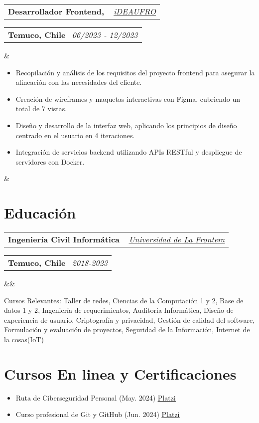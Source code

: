 \documentclass[11pt,a4paper,sans]{moderncv}
\makeatletter
\newcommand{\sectionMargin}{-3mm}
\newcommand*{\customcventry}[7][.13em]{
    \begin{tabular}{@{}l}
    {\bfseries #4} \
    {\itshape #3}
    \end{tabular}
    \hfill
    \begin{tabular}{l@{}}
    {\bfseries #5} \
    {\itshape #2}
    \end{tabular}
    \ifx&#7&%
    \else{\
    \begin{minipage}{\maincolumnwidth}%
    \small#7%
    \end{minipage}}\fi%
    \par\addvspace{#1}
}
\makeatother
\begin{document}
{\customcventry
    {06/2023 ‐ 12/2023}
    {{ \href{https://ideaufro.com/}{\underline{iDEAUFRO}} }}
    {Desarrollador Frontend,}
    {Temuco, Chile}{}
    {{\begin{itemize}[leftmargin=0.6cm, noitemsep, label={\textbullet}]
        \item Recopilación y análisis de los requisitos del proyecto frontend para asegurar la alineación con las necesidades del cliente.
        \item Creación de wireframes y maquetas interactivas con Figma, cubriendo un total de 7 vistas.
        \item Diseño y desarrollo de la interfaz web, aplicando los principios de diseño centrado en el usuario en 4 iteraciones.
        \item Integración de servicios backend utilizando APIs RESTful y despliegue de servidores con Docker.
    \end{itemize}}
}
}

\vspace*{\sectionMargin}

\section{Educación}{
\customcventry
    {2018-2023}
    { \href{https://1drv.ms/b/c/13c8ae619d64655e/EV5lZJ1hrsgggBOHLAAAAAABHh9OZUbWLd2nx7PTa_OSsg?e=Fedmge}{\underline{Universidad de La Frontera}} }
    {Ingeniería Civil Informática}
    {Temuco, Chile}
    {}{}
    {Cursos Relevantes: 
        {Taller de redes}, 
        {Ciencias de la Computación} 1 y 2, 
        {Base de datos 1 y 2}, 
        {Ingeniería de requerimientos},
        {Auditoria Informática}, 
        {Diseño de experiencia de usuario}, 
        {Criptografía y privacidad}, 
        Gestión de {calidad del software}, 
        {Formulación y evaluación de proyectos},
        {Seguridad de la Información},
        Internet de la cosas{(IoT)}
}
}

\vspace*{\sectionMargin}

\section{Cursos En linea y Certificaciones}{
\begin{itemize}[label=\textbullet, noitemsep]
    \item Ruta de Ciberseguridad Personal (May. 2024) \href{https://1drv.ms/b/c/13c8ae619d64655e/EZYaMe6SBhJAshtvq4ORCQoBwWMYRerI4_xiuqXjORVd0w?e=I4tLqg}{\underline{Platzi}}
    \item Curso profesional de Git y GitHub (Jun. 2024) \href{https://1drv.ms/b/c/13c8ae619d64655e/EXeQGPrTCjFDpmx8pCItVTwB-OS1r-tkKJbmgYnahuxtYg?e=mc9YcH}{\underline{Platzi}}
\end{itemize}
}
\end{document}
